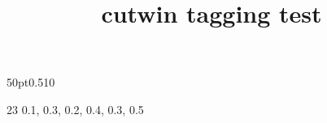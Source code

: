 \documentclass{article}
\title{cutwin tagging test}
\begin{document}
\opencutleft
\begin{cutout}{5}{0pt}{0.5\textwidth}{10}
\kant[1-2]
\end{cutout}

\opencutcenter
\newcommand*{\mycut}{%
  0.1\textwidth, 0.3\textwidth,
  0.2\textwidth, 0.4\textwidth,
  0.3\textwidth, 0.5\textwidth}
\renewcommand*{\putstuffinpic}{%
  \put(0,-8){\makebox(0,0){\Huge\bfseries \$}}}

\begin{shapedcutout}{2}{3}{\mycut}%
\kant[1]
\end{shapedcutout}
\end{document}
